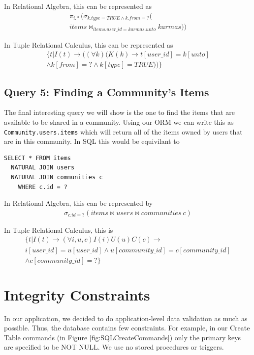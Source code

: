 \documentclass{acm_proc_article-sp}
\begin{document}
In Relational Algebra, this can be represented as
\[ \begin{split}
\pi_{i.*}(\sigma_{k.type=TRUE \land k.from=?}( \\
  items \bowtie_{items.user\_id=karmas.unto} karmas))
\end{split}\]

In Tuple Relational Calculus, this can be represented as
\[ 
\begin{split} \{ t | I(t) \to ((\forall k) (K(k) \to t[user\_id] = k[unto] \\
\land k[from] = ? \land k[type] = TRUE)) \} \end{split} \]

\subsection{Query 5: Finding a Community's Items}
The final interesting query we will show is the one to find the items that are available to be shared in a community.  Using our ORM we can write this as \texttt{Community.users.items} which will return all of the items owned by users that are in this community. In SQL this would be equivilant to 
\begin{lstlisting}
SELECT * FROM items 
  NATURAL JOIN users  
  NATURAL JOIN communities c
    WHERE c.id = ?
\end{lstlisting}

In Relational Algebra, this can be represented by
\[
\begin{split}
  \sigma_{c.id=?}(items \bowtie users 
    \bowtie communities~c)
\end{split}
\]

In Tuple Relational Calculus, this is
\[
\begin{split}
\{t|I(t) \rightarrow (\forall{i,u,c})I(i)U(u)C(c) \rightarrow\\
i[user\_id] = u[user\_id] \wedge u[community\_id] = c[community\_id]\\
\wedge c[community\_id] = ?\}
\end{split}
\]

\section{Integrity Constraints}
In our application, we decided to do application-level data validation as much as possible. Thus, the database
contains few constraints. For example, in our Create Table commands (in Figure \ref{fig:SQLCreateCommands}) only
the primary keys are specified to be NOT NULL. We use no stored procedures or triggers.
\end{document}
